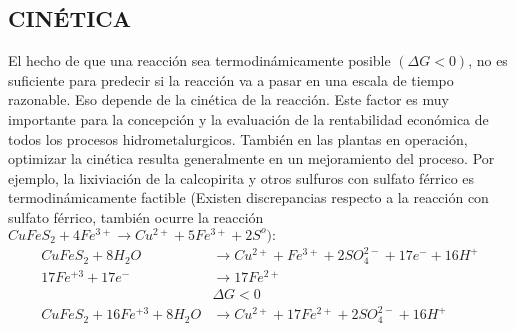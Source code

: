 \subsection{CIN\'ETICA}
El hecho de que una reacci\'on sea termodin\'amicamente posible $(\Delta G<0)$, no es suficiente para predecir si la reacci\'on va a pasar en una escala de tiempo razonable.  Eso  depende  de  la  cin\'etica  de  la  reacci\'on.  Este  factor  es  muy importante para la concepci\'on y la evaluaci\'on de la rentabilidad econ\'omica de todos los procesos hidrometalurgicos. Tambi\'en en las plantas en operaci\'on, optimizar la cin\'etica resulta generalmente en un mejoramiento del proceso.
Por ejemplo, la lixiviaci\'on de la calcopirita y otros sulfuros con sulfato f\'errico es termodin\'amicamente factible (Existen discrepancias respecto a la reacci\'on con sulfato f\'errico, tambi\'en ocurre la reacci\'on $CuFeS_2 + 4 Fe^{3+} \rightarrow Cu^{2+} + 5 Fe^{3+} +2S^o):$
\begin{equation}
 \begin{align}
CuFeS_2 + 8 H_2O& \rightarrow Cu^{2+} + Fe^{3+} + 2 SO_4^{2-} + 17 e^- + 16 H^+\\
17 Fe^{+3} +17 e^-& \rightarrow 17 Fe^{2+}\\
               &\Delta G<0\\
CuFeS_2 + 16 Fe^{+3} + 8H_2O & \rightarrow Cu^{2+} + 17 Fe^{2+} + 2 SO_4^{2-} + 16 H^+
 \end{align}
\end{equation}

